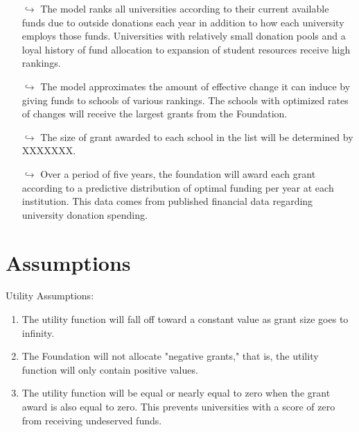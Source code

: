\documentclass[paper.tex]{subfiles}
\begin{document}
	\begin{itemize} 
		\item[$\hookrightarrow$] The model ranks all universities according to their current available funds due to outside donations each year in addition to how each university employs those funds. Universities with relatively small donation pools and a loyal history of fund allocation to expansion of student resources receive high rankings.
		\item[$\hookrightarrow$] The model approximates the amount of effective change it can induce by giving funds to schools of various rankings. The schools with optimized rates of changes will receive the largest grants from the Foundation.
		\item[$\hookrightarrow$] The size of grant awarded to each school in the list will be determined by XXXXXXX.
		\item[$\hookrightarrow$] Over a period of five years, the foundation will award each grant according to a predictive distribution of optimal funding per year at each institution. This data comes from published financial data regarding university donation spending.
	\end{itemize}
	
	
	\section{Assumptions}
Utility Assumptions:
	\begin{enumerate}
		\item The utility function will fall off toward a constant value as grant size goes to infinity.
		\item The Foundation will not allocate "negative grants," that is, the utility function will only contain positive values.
		\item The utility function will be equal or nearly equal to zero when the grant award is also equal to zero. This prevents universities with a score of zero from receiving undeserved funds.
	\end{enumerate}
\end{document}
